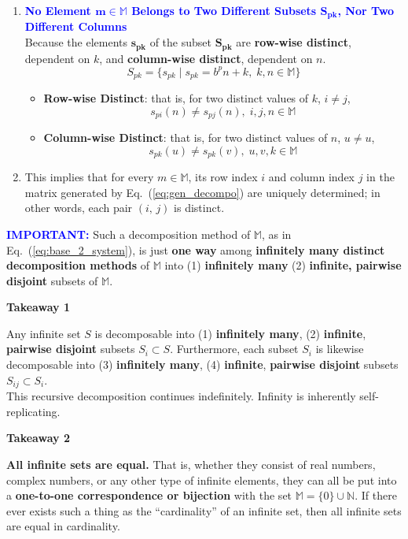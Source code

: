 \documentclass[12pt]{article}
\theoremstyle{definition} %
\numberwithin{equation}{section}
\newcommand{\eqrefc}[1]{Eq.~(\ref{eq:#1})}
\newcommand{\boldblu}[1]			    {\textbf{\textcolor{blue}{#1}}}
\newcommand{\tkatarget}[2]{%
  \noindent\phantomsection%
  \hypertarget{#1}{{\large\textbf{\textcolor{red!70!black}{Takeaway #2}}}}%
}
\begin{document}
\begin{enumerate}
\item \boldblu{No Element \(\bm{m \in \mathbb{M}}\) Belongs to Two Different Subsets \(\bm{S_{pk}}\), Nor Two Different Columns}\\[1ex]
Because the elements \(\bm{s_{pk}}\) of the subset \(\bm{S_{pk}}\) are \textbf{row-wise distinct}, dependent on \(k\), and \textbf{column-wise distinct}, dependent on \(n\).
\[
	S_{pk} = \{s_{pk} \mid s_{pk} = b^p n + k,\; k, n \in \mathbb{M} \}
\]

\begin{itemize}
\item \textbf{Row-wise Distinct}: that is, for two distinct values of \(k\), \(i \neq j\),
\[
	s_{pi}(n) \neq s_{pj}(n), \; i, j, n \in \mathbb{M}
\]

\item \textbf{Column-wise Distinct}: that is, for two distinct values of \(n\), \(u \neq u\),
\[
	s_{pk}(u) \neq s_{pk}(v), \; u, v, k \in \mathbb{M}
\]
\end{itemize}

\item This implies that for every \(m \in \mathbb{M}\), its row index \(i\) and column index \(j\) in the matrix generated by \eqrefc{gen_decompo} are uniquely determined; in other words, each pair \(\left(i,\, j\right)\) is distinct.

\end{enumerate}

\noindent \boldblu{IMPORTANT:} Such a decomposition method of \(\mathbb{M}\), as in \eqrefc{base_2_system}, is just \textbf{one way} among \textbf{infinitely many distinct decomposition methods} of \(\mathbb{M}\) into (1) \textbf{infinitely many} (2) \textbf{infinite, pairwise disjoint} subsets of \(\mathbb{M}\).

\vspace{1em}
\noindent \tkatarget{tka_1}{1}
Any infinite set \(S\) is decomposable into  
(1) \textbf{infinitely many},  
(2) \textbf{infinite},  
\textbf{pairwise disjoint} subsets \(S_i \subset S\). Furthermore, each subset \(S_i\) is likewise decomposable into  
(3) \textbf{infinitely many},  
(4) \textbf{infinite},  
\textbf{pairwise disjoint} subsets \(S_{ij} \subset S_i\).\\

\noindent This recursive decomposition continues indefinitely. Infinity is inherently self-replicating.

\vspace{1em} 
\noindent \tkatarget{tka_2}{2} 
\textbf{All infinite sets are equal.} That is, whether they consist of real numbers, complex numbers, or any other type of infinite elements, they can all be put into a \textbf{one-to-one correspondence or bijection} with the set \(\mathbb{M} = \{0\} \cup \mathbb{N}\).  
If there ever exists such a thing as the “cardinality” of an infinite set, then all infinite sets are equal in cardinality.
\end{document}
